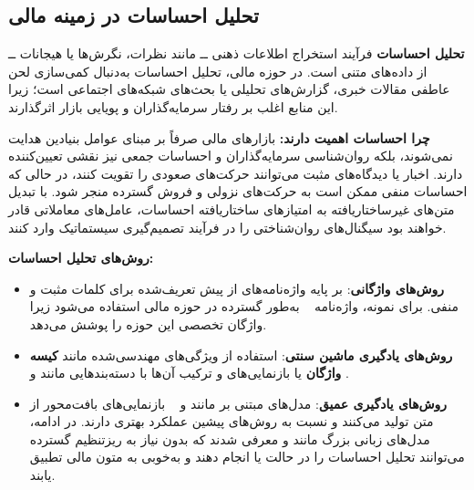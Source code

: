 \documentclass[12pt, a4paper]{report}
\begin{document}
\subsection{تحلیل احساسات در زمینه مالی\protect\footnotemark}

\textbf{تحلیل احساسات} فرآیند استخراج اطلاعات ذهنی ــ مانند نظرات، نگرش‌ها یا هیجانات ــ از داده‌های متنی است. در حوزه مالی، تحلیل احساسات به‌دنبال کمی‌سازی لحن عاطفی مقالات خبری، گزارش‌های تحلیلی یا بحث‌های شبکه‌های اجتماعی است؛ زیرا این منابع اغلب بر رفتار سرمایه‌گذاران و پویایی بازار اثرگذارند.  

\bigskip
\textbf{چرا احساسات اهمیت دارند:}  
بازارهای مالی صرفاً بر مبنای عوامل بنیادین هدایت نمی‌شوند، بلکه روان‌شناسی سرمایه‌گذاران و احساسات جمعی نیز نقشی تعیین‌کننده دارند. اخبار یا دیدگاه‌های مثبت می‌توانند حرکت‌های صعودی را تقویت کنند، در حالی که احساسات منفی ممکن است به حرکت‌های نزولی و فروش گسترده منجر شود. با تبدیل متن‌های غیرساختاریافته به امتیازهای ساختاریافته احساسات، عامل‌های معاملاتی قادر خواهند بود سیگنال‌های روان‌شناختی را در فرآیند تصمیم‌گیری سیستماتیک وارد کنند.

\bigskip

\textbf{روش‌های تحلیل احساسات:}
\begin{itemize}
    \item \textbf{روش‌های واژگانی}: بر پایه واژه‌نامه‌های از پیش تعریف‌شده برای کلمات مثبت و منفی. برای نمونه، واژه‌نامه ~\cite{loughran2011liability} به‌طور گسترده در حوزه مالی استفاده می‌شود زیرا واژگان تخصصی این حوزه را پوشش می‌دهد.
    
    \item \textbf{روش‌های یادگیری ماشین سنتی}: استفاده از ویژگی‌های مهندسی‌شده مانند \textbf{کیسه واژگان} یا بازنمایی‌های  و ترکیب آن‌ها با دسته‌بندهایی مانند  و .
    
    \item \textbf{روش‌های یادگیری عمیق}: مدل‌های مبتنی بر  مانند  و ~\cite{araci2019finbert} بازنمایی‌های بافت‌محور از متن تولید می‌کنند و نسبت به روش‌های پیشین عملکرد بهتری دارند. در ادامه، مدل‌های زبانی بزرگ مانند  و  معرفی شدند که بدون نیاز به ریزتنظیم گسترده می‌توانند تحلیل احساسات را در حالت  یا  انجام دهند و به‌خوبی به متون مالی تطبیق یابند.
\end{itemize}
\end{document}
